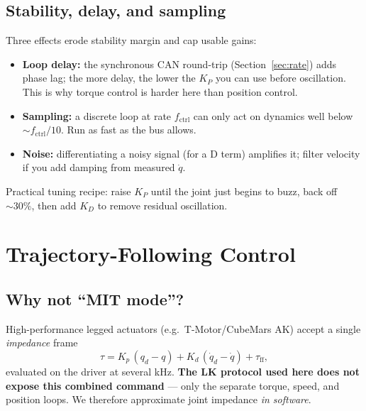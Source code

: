 \documentclass[11pt,a4paper]{article}
\begin{document}
\subsection{Stability, delay, and sampling}
Three effects erode stability margin and cap usable gains:
\begin{itemize}[nosep]
  \item \textbf{Loop delay:} the synchronous CAN round-trip (Section~\ref{sec:rate})
        adds phase lag; the more delay, the lower the $K_P$ you can use before
        oscillation. This is why torque control is harder here than position
        control.
  \item \textbf{Sampling:} a discrete loop at rate $f_{\text{ctrl}}$ can only act
        on dynamics well below $\sim f_{\text{ctrl}}/10$. Run as fast as the bus
        allows.
  \item \textbf{Noise:} differentiating a noisy signal (for a D term) amplifies
        it; filter velocity if you add damping from measured $\dot q$.
\end{itemize}
Practical tuning recipe: raise $K_P$ until the joint just begins to buzz, back
off $\sim30\%$, then add $K_D$ to remove residual oscillation.

\section{Trajectory-Following Control}

\subsection{Why not ``MIT mode''?}
High-performance legged actuators (e.g.\ T-Motor/CubeMars AK) accept a single
\emph{impedance} frame
\begin{equation}
  \tau = K_p\,(q_d - q) + K_d\,(\dot q_d - \dot q) + \tau_{\text{ff}},
  \label{eq:mit}
\end{equation}
evaluated on the driver at several kHz. \textbf{The LK protocol used here does
not expose this combined command} --- only the separate torque, speed, and
position loops. We therefore approximate joint impedance \emph{in software}.
\end{document}
